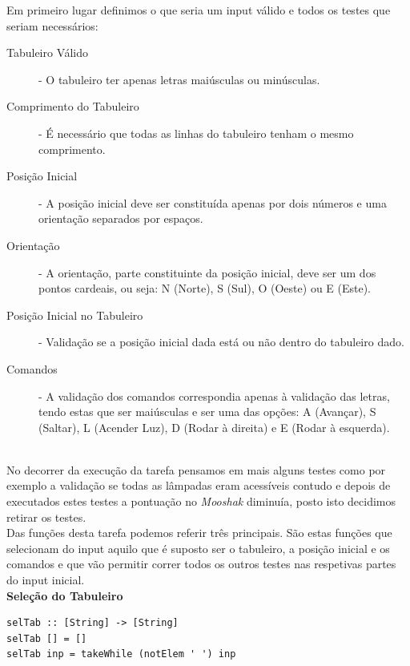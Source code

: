 \documentclass[a4paper,12pt,portuges]{article}
\begin{document}
Em primeiro lugar definimos o que seria um input válido e todos os testes que seriam necessários:\\

\begin{description}
\item[Tabuleiro Válido] - O tabuleiro ter apenas letras maiúsculas ou minúsculas.\\
\item[Comprimento do Tabuleiro]- É necessário que todas as linhas do tabuleiro tenham o mesmo comprimento.\\
\item[Posição Inicial]- A posição inicial deve ser constituída apenas por dois números e uma orientação separados por espaços.\\
\item[Orientação] - A orientação, parte constituinte da posição inicial, deve ser um dos pontos cardeais, ou seja: N (Norte), S (Sul), O (Oeste) ou E (Este).\\
\item[Posição Inicial no Tabuleiro] - Validação se a posição inicial dada está ou não dentro do tabuleiro dado.\\
\item[Comandos] - A validação dos comandos correspondia apenas à validação das letras, tendo estas que ser maiúsculas e ser uma das opções: A (Avançar), S (Saltar), L (Acender Luz), D (Rodar à direita) e E (Rodar à esquerda).\\
\end{description}
\\
No decorrer da execução da tarefa pensamos em mais alguns testes como por exemplo a validação se todas as lâmpadas eram acessíveis contudo e depois de executados estes testes a pontuação no \textit{Mooshak} diminuía, posto isto decidimos retirar os testes.
\\
Das funções desta tarefa podemos referir três principais. São estas funções que selecionam do input aquilo que é suposto ser o tabuleiro, a posição inicial e os comandos e que vão permitir correr todos os outros testes nas respetivas partes do input inicial.\\

    
\textbf{Seleção do Tabuleiro}
\begin{verbatim}
selTab :: [String] -> [String]
selTab [] = []
selTab inp = takeWhile (notElem ' ') inp
\end{verbatim}

\\
\end{document}
